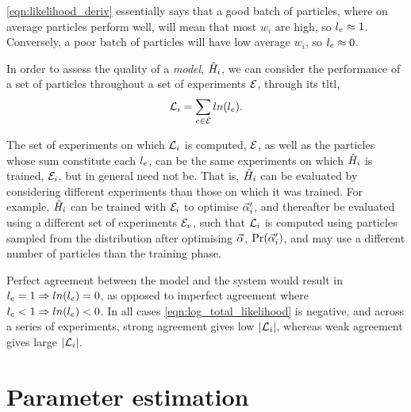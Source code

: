 \cref{eqn:likelihood_deriv} essentially says that a good batch of \glspl{particle}, 
    where on average \glspl{particle} perform well, 
    will mean that most $w_i$ are high, so $l_{e} \approx 1$. 
Conversely, a poor batch of \glspl{particle} will have low average $w_i$, so $l_{e} \approx 0$. 
\par

In order to assess the quality of a \emph{model}, $\hat{H}_i$, 
    we can consider the performance of a set of \glspl{particle} throughout a set of \glspl{experiment} ${ \mathcal{E} }$, 
    through its \gls{tltl}, 
\begin{equation}
    \label{eqn:log_total_likelihood}
    {\mathcal{L}}_{i} = \sum\limits_{e \in { \mathcal{E} }} ln(l_{e}).    
\end{equation}

The set of \glspl{experiment} on which ${\mathcal{L}}_{i}$ is computed, ${ \mathcal{E} }$, 
    as well as the \glspl{particle} whose sum constitute each $l_{e}$,
    can be the same \glspl{experiment} on which $\hat{H}_i$ is trained, ${ \mathcal{E} }_i$, but in general need not be.
That is, $\hat{H}_i$ can be evaluated by considering different \glspl{experiment} than those on which it was trained.
For example, $\hat{H}_i$ can be trained with ${ \mathcal{E} }_i$ to optimise $\vec{\alpha}_i^{\prime}$, 
    and thereafter be evaluated using a different set of \glspl{experiment} ${ \mathcal{E} }_v$, 
    such that ${\mathcal{L}}_{i}$ is computed using \glspl{particle} sampled from the distribution after optimising $\vec{\alpha}$, 
    $\Pr(\vec{\alpha}_i^{\prime})$, and may use a different number of \glspl{particle} than the training phase. 
\par 

Perfect agreement between the model and the system would result in $l_{e}=1 \Rightarrow ln(l_{e})=0$, 
    as opposed to imperfect agreement where $l_{e} < 1 \Rightarrow ln(l_{e}) < 0$.
In all cases \cref{eqn:log_total_likelihood} is negative, 
    and across a series of \glspl{experiment},
    strong agreement gives low $\lvert {\mathcal{L}}_{i} \rvert $, 
    whereas weak agreement gives large $\lvert {\mathcal{L}}_{i} \rvert $. 


\section{Parameter estimation}

